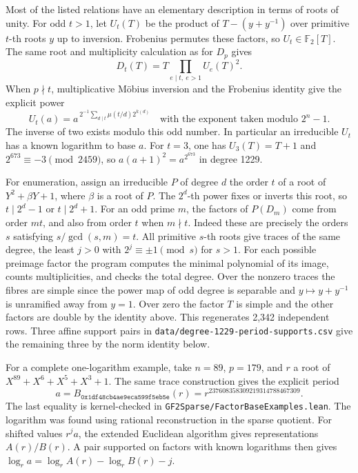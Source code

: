 \documentclass[11pt]{article}
\newcommand{\F}{\mathbb F_2}
\begin{document}
Most of the listed relations have an elementary description in terms of
roots of unity. For odd \(t>1\), let \(U_t(T)\) be the product of
\(T-(y+y^{-1})\) over primitive \(t\)-th roots \(y\) up to inversion.
Frobenius permutes these factors, so \(U_t\in\F[T]\). The same root
and multiplicity calculation as for \(D_p\) gives
\[
 D_t(T)=T\prod_{e\mid t,\ e>1} U_e(T)^2.
\]
When \(p\nmid t\), multiplicative M\"obius inversion and the Frobenius
identity give the explicit power
\[
 U_t(a)=a^{\,2^{-1}\sum_{d\mid t}\mu(t/d)2^{k(d)}}
 \quad\text{with the exponent taken modulo }2^n-1 .
\]
The inverse of two exists modulo this odd number. In particular an
irreducible \(U_t\) has a known logarithm to base \(a\). For \(t=3\),
one has \(U_3(T)=T+1\) and \(2^{673}\equiv-3\pmod{2459}\), so
\(a(a+1)^2=a^{2^{673}}\) in degree 1229.

For enumeration, assign an irreducible \(P\) of degree \(d\) the order
\(t\) of a root of \(Y^2+\beta Y+1\), where \(\beta\) is a root of \(P\).
The \(2^d\)-th power fixes or inverts this root, so \(t\mid 2^d-1\)
or \(t\mid 2^d+1\). For an odd prime \(m\), the factors of \(P(D_m)\)
come from order \(mt\), and also from order \(t\) when \(m\nmid t\).
Indeed these are precisely the orders \(s\) satisfying
\(s/\gcd(s,m)=t\). All primitive \(s\)-th roots give traces of the same
degree, the least \(j>0\) with \(2^j\equiv\pm1\pmod s\) for \(s>1\).
For each possible preimage factor the program computes the minimal
polynomial of its image, counts multiplicities, and checks the total
degree. Over the nonzero traces the fibres are simple since the
power map of odd degree is separable and \(y\mapsto y+y^{-1}\) is
unramified away from \(y=1\). Over zero the factor \(T\) is simple
and the other factors are double by the identity above.
This regenerates 2,342 independent rows. Three affine support pairs
in \nolinkurl{data/degree-1229-period-supports.csv} give the remaining
three by the norm identity below.

For a complete one-logarithm example, take \(n=89\), \(p=179\), and
\(r\) a root of \(X^{89}+X^6+X^5+X^3+1\). The same trace construction
gives the explicit period
\[
 a=B_{\mathtt{0x1df48cb4ae9eca599f5eb5e}}(r)
   =r^{237608358309219314788467309}.
\]
The last equality is kernel-checked in
\nolinkurl{GF2Sparse/FactorBaseExamples.lean}. The logarithm was found
using rational reconstruction in the sparse quotient. For shifted
values \(r^j a\), the extended Euclidean algorithm gives representations
\(A(r)/B(r)\). A pair supported on factors with known logarithms then
gives \(\log_r a=\log_r A(r)-\log_r B(r)-j\).
\end{document}
